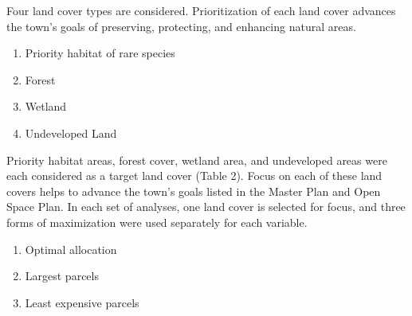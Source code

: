\documentclass[12pt, stu, floatsintext,table]{apa7}
\begin{document}
Four land cover types are considered. Prioritization of each land cover advances the town's goals of preserving, protecting, and enhancing natural areas.
\begin{enumerate}
\setlength\itemsep{0.0em}
    \item Priority habitat of rare species
    \item Forest
    \item Wetland
    \item Undeveloped Land
\end{enumerate}  
Priority habitat areas, forest cover, wetland area, and undeveloped areas were each considered as a target land cover (Table 2). Focus on each of these land covers helps to advance the town's goals listed in the Master Plan and Open Space Plan. In each set of analyses, one land cover is selected for focus, and three forms of maximization were used separately for each variable. 
\begin{enumerate}
\setlength\itemsep{0.0em}
    \item Optimal allocation
    \item Largest parcels
    \item Least expensive parcels
\end{enumerate}  

\begin{table}[htbp]
  \centering
  \caption{Types of land protection and sample of land protected in Franklin, MA. Most land is categorized as protected in perpetuity. This is land that is legally protected and often owned by the municipality or state. Land protected in a limited status is legally protected, but not in perpetuity.}
\end{table}
\end{document}
